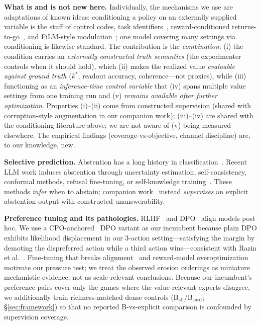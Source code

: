 \documentclass[11pt]{article}
\begin{document}
\textbf{What is and is not new here.} Individually, the mechanisms we use are adaptations of known ideas: conditioning a policy on an externally supplied variable is the stuff of control codes, task identifiers~\cite{oh2017zero}, reward-conditioned returns-to-go~\cite{chen2021decision}, and FiLM-style modulation~\cite{perez2018film}; one model covering many settings via conditioning is likewise standard. The contribution is the \emph{combination}: (i) the condition carries an \emph{externally constructed truth semantics} (the experimenter controls when it should hold), which (ii) makes the realized value \emph{evaluable against ground truth} ($k^*$, readout accuracy, coherence---not proxies), while (iii) functioning as an \emph{inference-time control variable} that (iv) spans multiple value settings from one training run and (v) \emph{remains available after further optimization}. Properties (i)--(ii) come from constructed supervision (shared with corruption-style augmentation in our companion work); (iii)--(iv) are shared with the conditioning literature above; we are not aware of (v) being measured elsewhere. The empirical findings (coverage-vs-objective, channel discipline) are, to our knowledge, new.

\textbf{Selective prediction.} Abstention has a long history in classification~\cite{chow1970optimum,geifman2017selective}. Recent LLM work induces abstention through uncertainty estimation, self-consistency, conformal methods, refusal fine-tuning, or self-knowledge training~\cite{kalai2025why,kuhn2023semantic,lin2024conformal,zhang2024rtuning,kadavath2022know}. These methods \emph{infer} when to abstain; companion work~\cite{kanber2026abstain} instead \emph{supervises} an explicit abstention output with constructed unanswerability.

\textbf{Preference tuning and its pathologies.} RLHF~\cite{ouyang2022training} and DPO~\cite{rafailov2023direct} align models post hoc. We use a CPO-anchored~\cite{xu2024contrastive} DPO variant as our incumbent because plain DPO exhibits likelihood displacement in our 3-action setting---satisfying the margin by demoting the dispreferred action while a third action wins---consistent with Razin et al.~\cite{razin2024unintentional}. Fine-tuning that breaks alignment~\cite{qi2023finetuning} and reward-model overoptimization~\cite{gao2023scaling} motivate our pressure test; we treat the observed erosion orderings as miniature mechanistic evidence, not as scale-relevant conclusions. Because our incumbent's preference pairs cover only the games where the value-relevant experts disagree, we additionally train richness-matched dense controls (B$_{\mathrm{all}}$/B$_{\mathrm{card}}$; \S\ref{sec:framework}) so that no reported B-vs-explicit comparison is confounded by supervision coverage.
\end{document}
